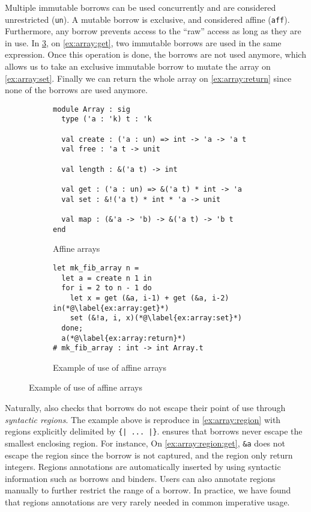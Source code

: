 Multiple immutable borrows can be used concurrently and are considered
unrestricted (\lstinline/un/).
A mutable borrow is exclusive, and considered affine (\lstinline/aff/).
Furthermore, any borrow prevents access to the ``raw'' access
as long as they are in use. In \cref{ex:array}, on \cref{ex:array:get},
two immutable borrows are used in the same expression. Once this operation
is done, the borrows are not used anymore, which allows us to take
an exclusive immutable borrow to mutate the array on \cref{ex:array:set}.
Finally we can return the whole array on \cref{ex:array:return} since
none of the borrows are used anymore.

\begin{figure}
  \centering
  \begin{subfigure}{0.48\linewidth}
\begin{lstlisting}
module Array : sig
  type ('a : 'k) t : 'k
  
  val create : ('a : un) => int -> 'a -> 'a t
  val free : 'a t -> unit

  val length : &('a t) -> int

  val get : ('a : un) => &('a t) * int -> 'a
  val set : &!('a t) * int * 'a -> unit
  
  val map : (&'a -> 'b) -> &('a t) -> 'b t
end
\end{lstlisting}
    \caption{Affine arrays}
    \label{sig:array}
  \end{subfigure}\hfill
  \begin{subfigure}{0.5\linewidth}
\begin{lstlisting}
let mk_fib_array n =
  let a = create n 1 in
  for i = 2 to n - 1 do
    let x = get (&a, i-1) + get (&a, i-2) in(*@\label{ex:array:get}*)
    set (&!a, i, x)(*@\label{ex:array:set}*)
  done;
  a(*@\label{ex:array:return}*)
# mk_fib_array : int -> int Array.t
\end{lstlisting}
    \caption{Example of use of affine arrays}
    \label{ex:array}
  \end{subfigure}
\end{figure}

Naturally, \lang also checks that borrows do not escape their point
of use through {\em syntactic regions}. The example
above is reproduce in \cref{ex:array:region} with
regions explicitly delimited by \lstinline/{| ... |}/.
\lang ensures that borrows never escape the smallest enclosing
region.
For instance, On \cref{ex:array:region:get}, \lstinline/&a/ does
not escape the region since the borrow is not captured, and the
region only return integers.
Regions annotations are automatically inserted by \lang using
syntactic information such as borrows and binders.
Users can also annotate regions manually to further restrict the range
of a borrow. In practice, we have found that regions
annotations are very rarely needed in common imperative usage.


